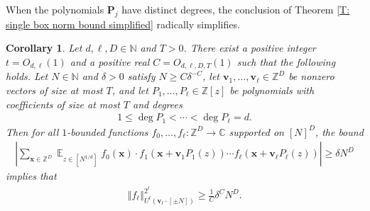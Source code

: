 \documentclass[11pt]{amsart}
\newtheorem{corollary}[lemma]{Corollary}
\theoremstyle{definition}
\DeclareMathOperator*{\E}{\mathbb{E}}
\newcommand{\C}{{\mathbb C}}
\newcommand{\N}{{\mathbb N}}
\newcommand{\Z}{{\mathbb Z}}
\newcommand{\p}{{\mathbf{P}}}
\newcommand{\bv}{{\mathbf{v}}}
\newcommand{\bx}{{\mathbf{x}}}
\newcommand{\norm}[1]{\left\Vert #1\right\Vert}
\newcommand{\abs}[1]{\mathopen{}\left| #1\mathclose{}\right|}
\begin{document}
When the polynomials $\p_j$ have distinct degrees, the conclusion of Theorem \ref{T: single box norm bound simplified} radically simplifies.
\begin{corollary}\label{C: distinct degrees}
    Let $d, \ell, D \in \N$ and $T>0$.  There exist a positive integer $t=O_{d, \ell}(1)$ and a positive real $C=O_{d,\ell,D,T}(1)$ such that the following holds.  Let $N\in\N$ and $\delta>0$ satisfy $N\geq C\delta^{-C}$, let $\bv_1, \ldots, \bv_\ell\in\Z^{{D}}$ be nonzero vectors of size at most $T$,  and let $P_1, \ldots, P_\ell\in\Z[z]$ be polynomials with coefficients of size at most $T$ and degrees
    \begin{align*}
        1\leq \deg P_1 < \cdots < \deg P_\ell =d.
    \end{align*}
     Then for all $1$-bounded functions $f_0, \ldots, f_\ell:\Z^D\to\C$ supported on $[N]^D$, the bound
    \begin{align*}
            \abs{\sum_{\bx\in\Z^D}\E_{z\in[N^{1/d}]}
            f_0(\bx)\cdot f_1(\bx+\bv_1 P_1(z))\cdots f_\ell(\bx+\bv_\ell P_\ell(z))} \geq \delta N^D
    \end{align*}
    implies that
    \begin{align*}
        \norm{f_\ell}_{U^t(\bv_\ell\cdot[\pm N])}^{2^{t}} \geq \frac{1}{C}\delta^{C}N^{D}.
    \end{align*}
\end{corollary}

\end{document}
